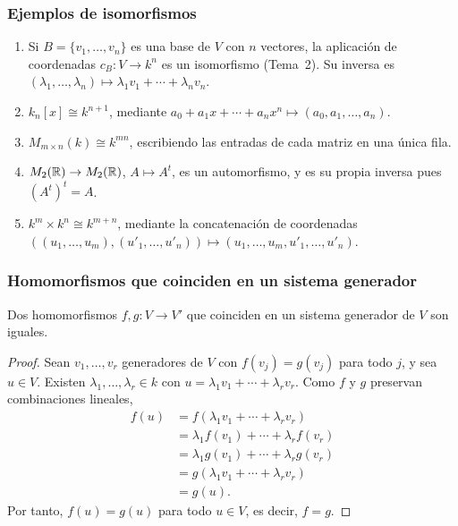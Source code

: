 \begin{frame}
    \frametitle{Ejemplos de isomorfismos}

    \begin{example}
        \begin{enumerate}
            \item Si $B=\{v_1,\ldots,v_n\}$ es una base de $V$ con $n$ vectores, la
            aplicación de coordenadas $c_B\colon V\to k^n$ es un
            isomorfismo (Tema~2). Su inversa es
            $(\lambda_1,\ldots,\lambda_n)\mapsto\lambda_1v_1+\cdots+\lambda_nv_n$.
            \item $k_n[x]\cong k^{n+1}$, mediante
            $a_0+a_1x+\cdots+a_nx^n\mapsto(a_0,a_1,\ldots,a_n)$.
            \item $M_{m\times n}(k)\cong k^{mn}$, escribiendo las
            entradas de cada matriz en una única fila.
            \item $M_2(\mathbb{R})\to M_2(\mathbb{R})$, $A\mapsto A^t$, es un automorfismo,
            y es su propia inversa pues $(A^t)^t=A$.
            \item $k^m\times k^n\cong k^{m+n}$, mediante la concatenación de coordenadas
            $((u_1,\ldots,u_m),(u'_1,\ldots,u'_n))\mapsto(u_1,\ldots,u_m,u'_1,\ldots,u'_n)$.
        \end{enumerate}
    \end{example}
\end{frame}

\begin{frame}
    \frametitle{Homomorfismos que coinciden en un sistema generador}

    \begin{proposition}
        Dos homomorfismos $f,g\colon V\to V'$ que coinciden en un sistema
        generador de $V$ son iguales.
    \end{proposition}

    \begin{proof}
        Sean $v_1,\ldots,v_r$ generadores de $V$ con $f(v_j)=g(v_j)$ para
        todo $j$, y sea $u\in V$. Existen $\lambda_1,\ldots,\lambda_r\in k$
        con $u=\lambda_1v_1+\cdots+\lambda_rv_r$. Como $f$ y $g$ preservan
        combinaciones lineales,
        \begin{align*}
            f(u)&=f(\lambda_1v_1+\cdots+\lambda_rv_r)\\
            &=\lambda_1f(v_1)+\cdots+\lambda_rf(v_r)\\
            &=\lambda_1g(v_1)+\cdots+\lambda_rg(v_r)\\
            &=g(\lambda_1v_1+\cdots+\lambda_rv_r)\\
            &=g(u).
        \end{align*}
        Por tanto, $f(u)=g(u)$ para todo $u\in V$, es decir, $f=g$.
    \end{proof}
\end{frame}

